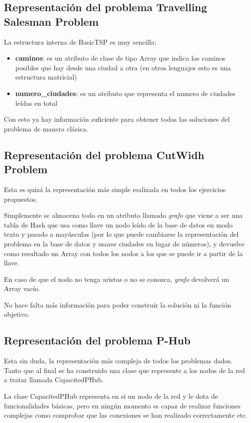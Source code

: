 \documentclass[12pt,a4paper,draft,openany]{article}
\begin{document}
\subsection{Representación del problema Travelling Salesman Problem}
La estructura interna de BasicTSP es muy sencilla:
\begin{itemize}
\item \textbf{caminos}: es un atributo de clase de tipo Array que indica los caminos posibles
que hay desde una ciudad a otra (en otros lenguajes esto es una estructura matricial)
\item \textbf{numero\_ciudades}: es un atributo que representa el numero de ciudades leídas en total
\end{itemize}

Con esto ya hay información suficiente para obtener todas las soluciones del problema de manera clásica.

\subsection{Representación del problema CutWidh Problem}
Esta es quizá la representación más simple realizada en todos los ejercicios propuestos. 

Simplemente se almacena todo en un atributo llamado \emph{grafo} que viene a ser una tabla de Hash que usa como llave un nodo leído de la base de datos en modo texto y pasado a mayúsculas (por lo que puede cambiarse la representación del problema en la base de datos y usarse ciudades en lugar de números), y devuelve como resultado un Array con todos los nodos a los que se puede ir a partir de la llave.

En caso de que el nodo no tenga aristas o no se conozca, \emph{grafo} devolverá un Array vacío.

No hace falta más información para poder construir la solución ni la función objetivo.

\subsection{Representación del problema P-Hub}
Esta sin duda, la representación más compleja de todos los problemas dados. Tanto que al final se ha construido una clase que represente a los nodos de la red a tratar llamada CapacitedPHub.

La clase CapacitedPHub representa en si un nodo de la red y le dota de funcionalidades básicas, pero en ningún momento es capaz de realizar funciones complejas como comprobar que las conexiones se han realizado correctamente etc.
\end{document}
